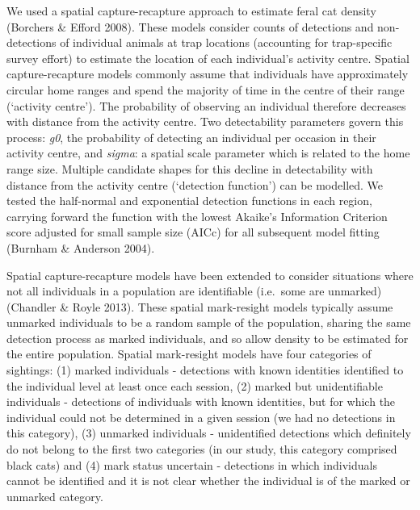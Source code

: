 \documentclass[]{elsarticle} %
\begin{document}
We used a spatial capture-recapture approach to estimate feral cat density (Borchers \& Efford 2008). These models consider counts of detections and non-detections of individual animals at trap locations (accounting for trap-specific survey effort) to estimate the location of each individual's activity centre. Spatial capture-recapture models commonly assume that individuals have approximately circular home ranges and spend the majority of time in the centre of their range (`activity centre'). The probability of observing an individual therefore decreases with distance from the activity centre. Two detectability parameters govern this process: \emph{g0}, the probability of detecting an individual per occasion in their activity centre, and \emph{sigma}: a spatial scale parameter which is related to the home range size. Multiple candidate shapes for this decline in detectability with distance from the activity centre (`detection function') can be modelled. We tested the half-normal and exponential detection functions in each region, carrying forward the function with the lowest Akaike's Information Criterion score adjusted for small sample size (AICc) for all subsequent model fitting (Burnham \& Anderson 2004).

Spatial capture-recapture models have been extended to consider situations where not all individuals in a population are identifiable (i.e.~some are unmarked) (Chandler \& Royle 2013). These spatial mark-resight models typically assume unmarked individuals to be a random sample of the population, sharing the same detection process as marked individuals, and so allow density to be estimated for the entire population. Spatial mark-resight models have four categories of sightings: (1) marked individuals - detections with known identities identified to the individual level at least once each session, (2) marked but unidentifiable individuals - detections of individuals with known identities, but for which the individual could not be determined in a given session (we had no detections in this category), (3) unmarked individuals - unidentified detections which definitely do not belong to the first two categories (in our study, this category comprised black cats) and (4) mark status uncertain - detections in which individuals cannot be identified and it is not clear whether the individual is of the marked or unmarked category.
\end{document}
